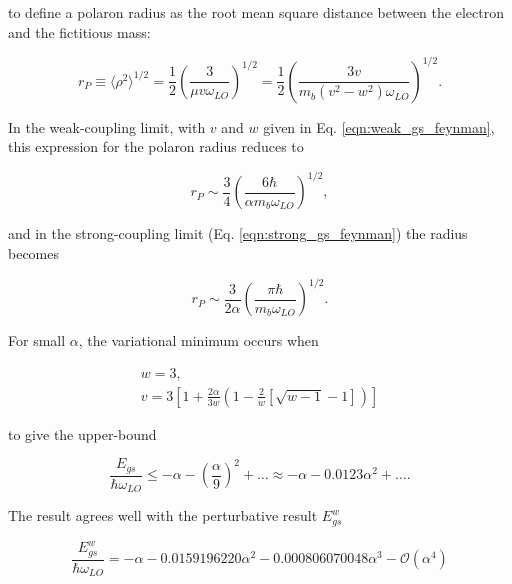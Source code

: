 to define a polaron radius as the root mean square distance between the electron and the fictitious mass:

\begin{equation}
    \label{eqn:pol_size_schultz}
    r_P \equiv \langle \rho^2 \rangle^{1/2} = \frac{1}{2} \left(\frac{3}{\mu v \omega_{LO}}\right)^{1/2} = \frac{1}{2} \left( \frac{3 v}{m_b (v^2 - w^2) \omega_{LO}} \right)^{1/2}.
\end{equation}

In the weak-coupling limit, with $v$ and $w$ given in Eq. \ref{eqn:weak_gs_feynman}, this expression for the polaron radius reduces to

\begin{equation}
    \label{eqn:weak_size_schultz}
    r_P \sim \frac{3}{4} \left(\frac{6\hbar}{\alpha m_b \omega_{LO}}\right)^{1/2},
\end{equation}

and in the strong-coupling limit (Eq. \ref{eqn:strong_gs_feynman}) the radius becomes 

\begin{equation}
    \label{eqn:strong_size_schultz}
    r_P \sim \frac{3 }{2\alpha} \left(\frac{\pi \hbar}{m_b \omega_{LO}}\right)^{1/2}.
\end{equation}

For small $\alpha$, the variational minimum occurs when

\begin{equation}
\begin{gathered}
    w = 3, \\ 
    v = 3 \left[ 1 + \frac{2\alpha}{3w} \left(1 -\frac{2}{w} \left[ \sqrt{w-1}-1 \right] \right) \right]
\end{gathered}
\end{equation}

to give the upper-bound

\begin{equation}
    \frac{E_{gs}}{\hbar\omega_{LO}} \leq -\alpha - \left(\frac{\alpha}{9}\right)^2 + \dots \approx -\alpha - 0.0123 \alpha^2 + \dots.
\end{equation}

The result agrees well with the perturbative result $E^w_{gs}$

\begin{equation}
    \frac{E^w_{gs}}{\hbar\omega_{LO}} = -\alpha - 0.0159196220 \alpha^2 - 0.000806070048 \alpha^3 - \mathcal{O}\left(\alpha^4\right) 
\end{equation}

